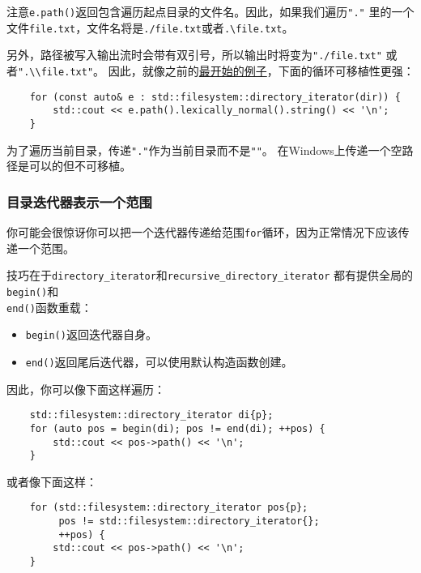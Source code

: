 注意\texttt{e.path()}返回包含遍历起点目录的文件名。因此，如果我们遍历\texttt{"."}
里的一个文件\texttt{file.txt}，文件名将是\texttt{./file.txt}或者\texttt{.\textbackslash file.txt}。

另外，路径被写入输出流时会带有双引号，所以输出时将变为\texttt{"./file.txt"}
或者\texttt{".\textbackslash \textbackslash file.txt"}。
因此，就像之前的\hyperref[ch20.1.3.5]{最开始的例子}，下面的循环可移植性更强：
\begin{lstlisting}
    for (const auto& e : std::filesystem::directory_iterator(dir)) {
        std::cout << e.path().lexically_normal().string() << '\n';
    }
\end{lstlisting}
为了遍历当前目录，传递\texttt{"."}作为当前目录而不是\texttt{""}。
在Windows上传递一个空路径是可以的但不可移植。

\subsubsection{目录迭代器表示一个范围}
你可能会很惊讶你可以把一个迭代器传递给范围\texttt{for}循环，因为正常情况下应该传递一个范围。

技巧在于\texttt{directory\_iterator}和\texttt{recursive\_directory\_iterator}
都有提供全局的\texttt{begin()}和\\
\texttt{end()}函数重载：
\begin{itemize}
    \item \texttt{begin()}返回迭代器自身。
    \item \texttt{end()}返回尾后迭代器，可以使用默认构造函数创建。
\end{itemize}
因此，你可以像下面这样遍历：
\begin{lstlisting}
    std::filesystem::directory_iterator di{p};
    for (auto pos = begin(di); pos != end(di); ++pos) {
        std::cout << pos->path() << '\n';
    }
\end{lstlisting}
或者像下面这样：
\begin{lstlisting}
    for (std::filesystem::directory_iterator pos{p};
         pos != std::filesystem::directory_iterator{};
         ++pos) {
        std::cout << pos->path() << '\n';
    }
\end{lstlisting}


